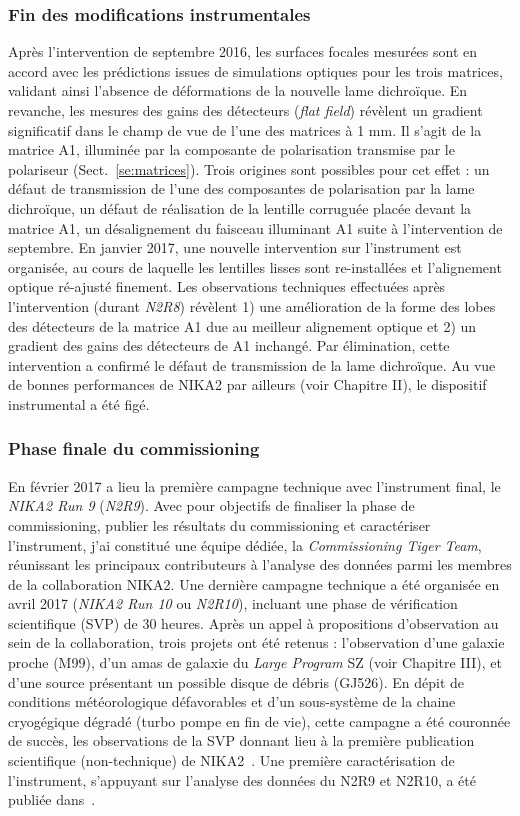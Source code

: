 \subsubsection{Fin des modifications instrumentales}
Après l'intervention de septembre 2016, les surfaces focales mesurées
sont en accord avec les prédictions issues de simulations optiques pour
les trois matrices, validant ainsi l'absence de déformations de la
nouvelle lame dichroïque. En revanche, les mesures des gains des
détecteurs (\emph{flat field}) révèlent un gradient significatif dans
le champ de vue de l'une des matrices à 1 mm. Il s'agit de la matrice
A1, illuminée par la composante de polarisation transmise par le
polariseur (Sect.~\ref{se:matrices}). Trois origines sont possibles
pour cet effet : un défaut de transmission de l'une des composantes de
polarisation par la lame dichroïque, un défaut de réalisation de la
lentille corruguée placée devant la matrice A1, un désalignement du
faisceau illuminant A1 suite à l'intervention de septembre. En janvier
2017, une nouvelle intervention sur l'instrument est organisée, au
cours de laquelle les lentilles lisses sont re-installées et
l'alignement optique ré-ajusté finement. Les observations techniques
effectuées après l'intervention (durant \emph{N2R8}) révèlent 1) une
amélioration de la forme des lobes des détecteurs de la matrice A1 due
au meilleur alignement optique et 2) un gradient des gains des
détecteurs de A1 inchangé. Par élimination, cette intervention a
confirmé le défaut de transmission de la lame dichroïque. Au vue de
bonnes performances de NIKA2 par ailleurs (voir Chapitre II),
le dispositif instrumental a été figé.

\subsubsection{Phase finale du commissioning}
En février 2017 a lieu la première campagne technique avec
l'instrument final, le \emph{NIKA2 Run 9} (\emph{N2R9}). Avec pour
objectifs de finaliser la phase de commissioning, publier les
résultats du commissioning et caractériser l'instrument, j'ai
constitué une équipe dédiée, la \emph{Commissioning Tiger Team},
réunissant les principaux contributeurs à l'analyse des données parmi
les membres de la collaboration NIKA2. Une dernière campagne technique
a été organisée en avril 2017 (\emph{NIKA2 Run 10} ou \emph{N2R10}),
incluant une phase de vérification scientifique (SVP) de 30
heures. Après un appel à propositions d'observation
au sein de la collaboration, trois projets ont été retenus :
l'observation d'une galaxie proche (M99), d'un amas de galaxie du
\emph{Large Program} SZ (voir Chapitre III), et d'une source
présentant un possible disque de débris (GJ526). En dépit de
conditions météorologique défavorables et d'un sous-système de la
chaine cryogégique dégradé (turbo pompe en fin de vie), cette campagne
a été couronnée de succès, les observations de la SVP donnant lieu à
la première publication scientifique (non-technique) de
NIKA2~\citep{Ruppin2018}. Une première caractérisation de l'instrument,
s'appuyant sur l'analyse des données du N2R9 et N2R10, a été publiée
dans~\citet{Adam2018}.

